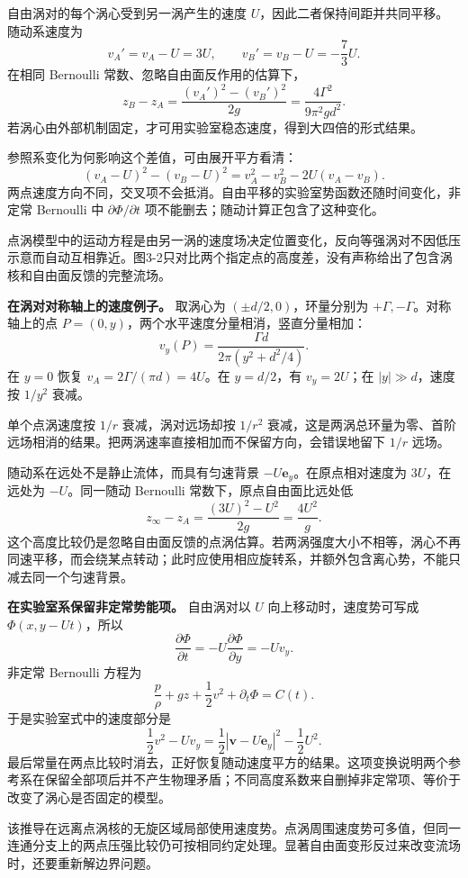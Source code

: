 \documentclass[12pt,a4paper,UTF8]{ctexart}
\begin{document}
自由涡对的每个涡心受到另一涡产生的速度
\(U\)，因此二者保持间距并共同平移。随动系速度为 \[
v_A'=v_A-U=3U,\qquad v_B'=v_B-U=-\frac73U.
\] 在相同 Bernoulli 常数、忽略自由面反作用的估算下， \[
z_B-z_A=\frac{(v_A')^2-(v_B')^2}{2g}
=\frac{4\Gamma^2}{9\pi^2gd^2}.
\] 若涡心由外部机制固定，才可用实验室稳态速度，得到大四倍的形式结果。

参照系变化为何影响这个差值，可由展开平方看清： \[
(v_A-U)^2-(v_B-U)^2=v_A^2-v_B^2-2U(v_A-v_B).
\]
两点速度方向不同，交叉项不会抵消。自由平移的实验室势函数还随时间变化，非定常
Bernoulli 中 \(\partial\Phi/\partial t\)
项不能删去；随动计算正包含了这种变化。

点涡模型中的运动方程是由另一涡的速度场决定位置变化，反向等强涡对不因低压示意而自动互相靠近。图3-2只对比两个指定点的高度差，没有声称给出了包含涡核和自由面反馈的完整流场。

\textbf{在涡对对称轴上的速度例子。} 取涡心为 \((\pm d/2,0)\)，环量分别为
\(+\Gamma,-\Gamma\)。对称轴上的点
\(P=(0,y)\)，两个水平速度分量相消，竖直分量相加： \[
v_y(P)=\frac{\Gamma d}{2\pi(y^2+d^2/4)}.
\] 在 \(y=0\) 恢复 \(v_A=2\Gamma/(\pi d)=4U\)。在 \(y=d/2\)，有
\(v_y=2U\)；在 \(|y|\gg d\)，速度按 \(1/y^2\) 衰减。

单个点涡速度按 \(1/r\) 衰减，涡对远场却按 \(1/r^2\)
衰减，这是两涡总环量为零、首阶远场相消的结果。把两涡速率直接相加而不保留方向，会错误地留下
\(1/r\) 远场。

随动系在远处不是静止流体，而具有匀速背景 \(-U\bm e_y\)。在原点相对速度为
\(3U\)，在远处为 \(-U\)。同一随动 Bernoulli 常数下，原点自由面比远处低
\[
z_\infty-z_A=\frac{(3U)^2-U^2}{2g}=\frac{4U^2}{g}.
\]
这个高度比较仍是忽略自由面反馈的点涡估算。若两涡强度大小不相等，涡心不再同速平移，而会绕某点转动；此时应使用相应旋转系，并额外包含离心势，不能只减去同一个匀速背景。

\textbf{在实验室系保留非定常势能项。} 自由涡对以 \(U\)
向上移动时，速度势可写成 \(\Phi(x,y-Ut)\)，所以 \[
\frac{\partial\Phi}{\partial t}=-U\frac{\partial\Phi}{\partial y}=-Uv_y.
\] 非定常 Bernoulli 方程为 \[
\frac p\rho+gz+\frac12v^2+\partial_t\Phi=C(t).
\] 于是实验室式中的速度部分是 \[
\frac12v^2-Uv_y=\frac12|\bm v-U\bm e_y|^2-\frac12U^2.
\]
最后常量在两点比较时消去，正好恢复随动速度平方的结果。这项变换说明两个参考系在保留全部项后并不产生物理矛盾；不同高度系数来自删掉非定常项、等价于改变了涡心是否固定的模型。

该推导在远离点涡核的无旋区域局部使用速度势。点涡周围速度势可多值，但同一连通分支上的两点压强比较仍可按相同约定处理。显著自由面变形反过来改变流场时，还要重新解边界问题。
\end{document}
